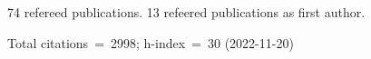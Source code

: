 74 refereed publications. 13 refeered publications as first author.

Total citations~=~2998; h-index~=~30 (2022-11-20)